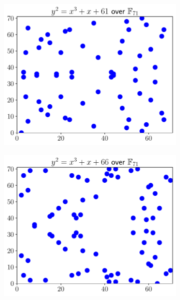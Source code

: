 \begin{figure}[p]
\centering
    \begin{subfigure}[t]{0.45\textwidth}
    \includegraphics[width=\textwidth]{plots/ec_finite/ec_finite_F_71_1_61.pdf}
    \end{subfigure}
    \begin{subfigure}[t]{0.45\textwidth}
    \includegraphics[width=\textwidth]{plots/ec_finite/ec_finite_F_71_1_66.pdf}
    \end{subfigure}


\end{figure}
